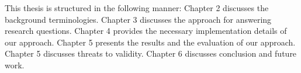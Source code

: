 This thesis is structured in the following manner: Chapter 2 discusses the background terminologies. Chapter 3 discusses the approach for answering research questions. Chapter 4 provides the necessary implementation details of our approach. Chapter 5 presents the results and the evaluation of our approach. Chapter 5 discusses threats to validity. Chapter 6 discusses conclusion and future work. 

